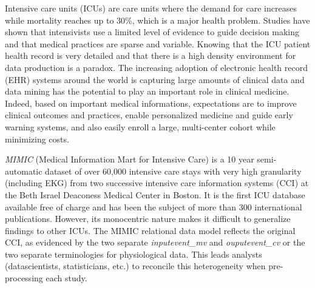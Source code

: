 %
%
Intensive care units (ICUs) are care units where the demand for care 
increases\cite{angus2000} while mortality reaches up to 30\%, 
which is a major health problem\cite{icu-mortality}. 
Studies have shown that intensivists use a limited level of evidence 
to guide decision making\cite{icu-evidence} 
and that medical practices are sparse and variable.
Knowing that the ICU patient health record is very detailed and that there is 
a high density environment for data production is a paradox. 
The increasing adoption of electronic health record (EHR) systems 
around the world is capturing large amounts of clinical data\cite{bigdata-promise} 
and data mining has the potential to play an important role 
in clinical medicine\cite{bigdata-mining}. 
Indeed, based on important medical informations, expectations are 
to improve clinical outcomes and practices, 
enable personalized medicine and guide early warning systems, 
and also easily enroll a large, multi-center cohort while minimizing costs.

\emph{MIMIC} (Medical Information Mart for Intensive Care) 
is a 10 year semi-automatic dataset of over 60,000 intensive care stays 
with very high granularity (including EKG) 
from two successive intensive care information systems (CCI)
 at the Beth Israel Deaconess Medical Center in Boston. 
It is the first ICU database available free of charge and has been the subject 
of more than 300 international publications. 
However, its monocentric nature makes it difficult to generalize findings to other ICUs. 
The MIMIC relational data model reflects the original CCI, 
as evidenced by the two separate \textit{inputevent\_mv} and \textit{ouputevent\_cv} \cite{mimic-nature}
or the two separate terminologies for physiological data. 
This leads analysts (datascientists, statisticians, etc.) 
to reconcile this heterogeneity when pre-processing each study.

